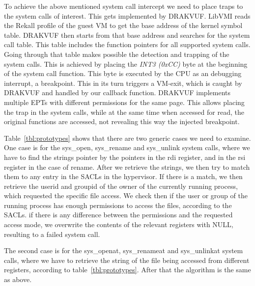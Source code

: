 To achieve the above mentioned system call intercept we need to place traps to the system calls of interest. This gets implemented by DRAKVUF. LibVMI reads the Rekall profile of the guest \ac{VM} to get the base address of the kernel symbol table. DRAKVUF then starts from that base address and searches for the system call table. This table includes the function pointers for all supported system calls. Going through that table makes possible the detection and trapping of the system calls. This is achieved by placing the \textit{INT3 (0xCC)} byte at the beginning of the system call function. This byte is executed by the \ac{CPU} as an debugging interrupt, a breakpoint. This in its turn triggers a VM-exit, which is caught by DRAKVUF and handled by our callback function. DRAKVUF implements multiple \ac{EPT}s with different permissions for the same page. This allows placing the trap in the system calls, while at the same time when accessed for read, the original functions are accessed, not revealing this way the injected breakpoint.

\par Table~\ref{tbl:prototypes} shows that there are two generic cases we need to examine. One case is for the sys\_open, sys\_rename and sys\_unlink system calls, where we have to find the strings pointer by the pointers in the rdi register, and in the rsi register in the case of rename. After we retrieve the strings, we then try to match them to any entry in the \ac{SACL}s in the hypervisor. If there is a match, we then retrieve the userid and groupid of the owner of the currently running process, which requested the specific file access. We check then if the user or group of the running process has enough permissions to access the files, according to the \ac{SACL}s. if there is any difference between the permissions and the requested access mode, we overwrite the contents of the relevant registers with NULL, resulting to a failed system call.

\par The second case is for the sys\_openat, sys\_renameat and sys\_unlinkat system calls, where we have to retrieve the string of the file being accessed from different registers, according to table~\ref{tbl:prototypes}. After that the algorithm is the same as above.


